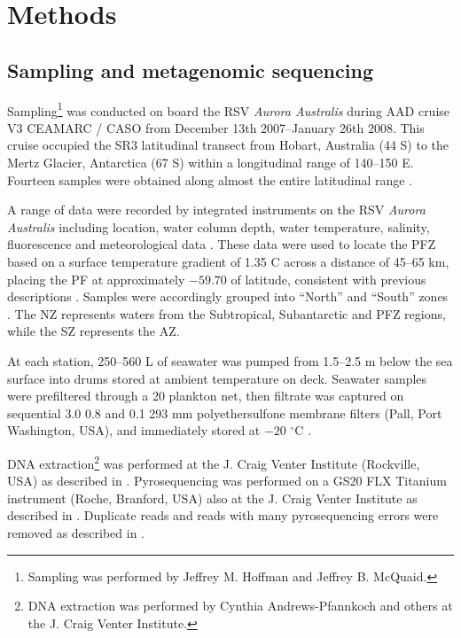 \section{Methods}
\subsection{Sampling and metagenomic sequencing}

Sampling\footnote{Sampling was performed by Jeffrey M. Hoffman and Jeffrey B. McQuaid.} was conducted on board the RSV \emph{Aurora Australis} during \ac{AAD} cruise V3 \ac{CEAMARC} / \ac{CASO} from December 13th 2007--January 26th 2008. 
This cruise occupied the SR3 latitudinal transect from Hobart, Australia (44\textdegree{} S) to the Mertz Glacier, Antarctica (67\textdegree{} S) within a longitudinal range of 140--150\textdegree{} E.
Fourteen samples were obtained along almost the entire latitudinal range .



A range of data were recorded by integrated instruments on the RSV \emph{Aurora Australis} including location, water column depth, water temperature, salinity, fluorescence and meteorological data .
These data were used to locate the \ac{PFZ} based on a surface temperature gradient of \textapprox{} 1.35 \textdegree{}C across a distance of 45--65 km, placing the \ac{PF} at approximately $-59.70$\textdegree{} of latitude, consistent with previous descriptions \cite{Moore:1999to,Sokolov:2002tc}.
Samples were accordingly grouped into ``North'' and ``South'' zones .
The \ac{NZ} represents waters from the Subtropical, Subantarctic and \ac{PFZ} regions, while the \ac{SZ} represents the \ac{AZ}.



At each station, \textapprox{} 250--560 L of seawater was pumped from \textapprox{} 1.5--2.5 m below the sea surface into drums stored at ambient temperature on deck. 
Seawater samples were prefiltered through a 20 \micron{} plankton net, then filtrate was captured on sequential 3.0 \micron{} 0.8 \micron{} and 0.1 \micron{} 293 mm polyethersulfone membrane filters (Pall, Port Washington, USA), and immediately stored at $-20$ $^\circ$C \cite{Rusch:2007ez,Ng:2010cd}.

DNA extraction\footnote{DNA extraction was performed by Cynthia Andrews-Pfannkoch and others at the J. Craig Venter Institute.} was performed at the J. Craig Venter Institute (Rockville, USA) as described in \citet{Rusch:2007ez}.
Pyrosequencing was performed on a GS20 FLX Titanium instrument (Roche, Branford, USA) also at the J. Craig Venter Institute as described in \citet{Lauro:2010jna}.
Duplicate reads and reads with many pyrosequencing errors were removed as described in \citet{Lauro:2010jna}.

